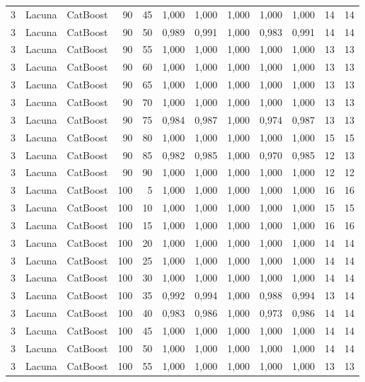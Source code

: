 \begin{longtable}{@{}rllrrrrrrrrr@{}}
3 & Lacuna & CatBoost & 90 & 45 & 1,000 & 1,000 & 1,000 & 1,000 & 1,000 & 14 & 14 \\
3 & Lacuna & CatBoost & 90 & 50 & 0,989 & 0,991 & 1,000 & 0,983 & 0,991 & 14 & 14 \\
3 & Lacuna & CatBoost & 90 & 55 & 1,000 & 1,000 & 1,000 & 1,000 & 1,000 & 13 & 13 \\
3 & Lacuna & CatBoost & 90 & 60 & 1,000 & 1,000 & 1,000 & 1,000 & 1,000 & 13 & 13 \\
3 & Lacuna & CatBoost & 90 & 65 & 1,000 & 1,000 & 1,000 & 1,000 & 1,000 & 13 & 13 \\
3 & Lacuna & CatBoost & 90 & 70 & 1,000 & 1,000 & 1,000 & 1,000 & 1,000 & 13 & 13 \\
3 & Lacuna & CatBoost & 90 & 75 & 0,984 & 0,987 & 1,000 & 0,974 & 0,987 & 13 & 13 \\
3 & Lacuna & CatBoost & 90 & 80 & 1,000 & 1,000 & 1,000 & 1,000 & 1,000 & 15 & 15 \\
3 & Lacuna & CatBoost & 90 & 85 & 0,982 & 0,985 & 1,000 & 0,970 & 0,985 & 12 & 13 \\
3 & Lacuna & CatBoost & 90 & 90 & 1,000 & 1,000 & 1,000 & 1,000 & 1,000 & 12 & 12 \\
3 & Lacuna & CatBoost & 100 & 5 & 1,000 & 1,000 & 1,000 & 1,000 & 1,000 & 16 & 16 \\
3 & Lacuna & CatBoost & 100 & 10 & 1,000 & 1,000 & 1,000 & 1,000 & 1,000 & 15 & 15 \\
3 & Lacuna & CatBoost & 100 & 15 & 1,000 & 1,000 & 1,000 & 1,000 & 1,000 & 16 & 16 \\
3 & Lacuna & CatBoost & 100 & 20 & 1,000 & 1,000 & 1,000 & 1,000 & 1,000 & 14 & 14 \\
3 & Lacuna & CatBoost & 100 & 25 & 1,000 & 1,000 & 1,000 & 1,000 & 1,000 & 14 & 14 \\
3 & Lacuna & CatBoost & 100 & 30 & 1,000 & 1,000 & 1,000 & 1,000 & 1,000 & 14 & 14 \\
3 & Lacuna & CatBoost & 100 & 35 & 0,992 & 0,994 & 1,000 & 0,988 & 0,994 & 13 & 14 \\
3 & Lacuna & CatBoost & 100 & 40 & 0,983 & 0,986 & 1,000 & 0,973 & 0,986 & 14 & 14 \\
3 & Lacuna & CatBoost & 100 & 45 & 1,000 & 1,000 & 1,000 & 1,000 & 1,000 & 14 & 14 \\
3 & Lacuna & CatBoost & 100 & 50 & 1,000 & 1,000 & 1,000 & 1,000 & 1,000 & 14 & 14 \\
3 & Lacuna & CatBoost & 100 & 55 & 1,000 & 1,000 & 1,000 & 1,000 & 1,000 & 13 & 13 \\

\end{longtable}
